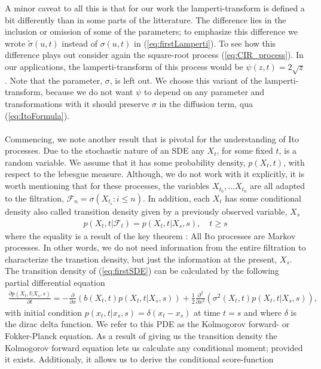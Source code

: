 A minor caveat to all this is that for our work the lamperti-transform is defined a bit differently than in some parts of the litterature. The difference lies in the inclusion or omission of some of the parameters; to emphasize this difference we wrote $\tilde{\sigma}(u, t)$ instead of $\sigma(u, t)$ in (\ref{eq:firstLamperti}). To see how this difference plays out consider again the square-root process (\ref{eq:CIR_process}). In our applications, the lamperti-transform of this process would be $\psi(z,t) = 2\sqrt{z}$. Note that the parameter, $\sigma$, is left out. We choose this variant of the lamperti-transform, because we do not want $\psi$ to depend on any parameter and transformations with it should preserve $\sigma$ in the diffusion term, qua (\ref{eq:ItoFormula}).\\\\
Commencing, we note another result that is pivotal for the understanding of Ito processes. Due to the stochastic nature of an SDE any $X_t$, for some fixed $t$, is a random variable. We assume that it has some probability density, $p(X_t, t)$, with respect to the lebesgue measure. Although, we do not work with it explicitly, it is worth mentioning that for these processes, the variables $X_{t_0}, \dots X_{t_n}$ are all adapted to the filtration, $\mathcal{F}_n = \sigma\left(X_{t_i}: i \leq n\right)$. In addition, each $X_t$ has some conditional density also called transition density given by a previously observed variable, $X_s$ 
\begin{align}
    p(X_t, t| \mathcal{F}_t) = p(X_t, t | X_s, s), \quad t\geq s
\end{align}
where the equality is a result of the key theorem \cite[theorem 7.1.2]{Oksendal2003_yu}: All Ito processes are Markov processes. In other words, we do not need information from the entire filtration to characterize the transtion density, but just the information at the present, $X_s$. The transition density of (\ref{eq:firstSDE}) can be calculated by the following partial differential equation
\begin{align}
    \frac{\partial p(X_t, t | X_s, s)}{\partial t} = -\frac{\partial}{\partial x}\left(b(X_t, t)p(X_t, t | X_s, s)\right) + \frac{1}{2}\frac{\partial^2}{\partial x^2}\left(\sigma^2(X_t, t)p(X_t, t | X_s, s)\right),\label{eq:fokkerPlanck} 
\end{align}
with initial condition $p(x_t, t|x_s, s) = \delta(x_t - x_s)$ at time $t = s$ and where $\delta$ is the dirac delta function. We refer to this PDE as the Kolmogorov forward- or Fokker-Planck equation. As a result of giving us the transition density the Kolmogorov forward equation lets us calculate any conditional moment; provided it exists. Additionaly, it allows us to derive the conditional score-function
